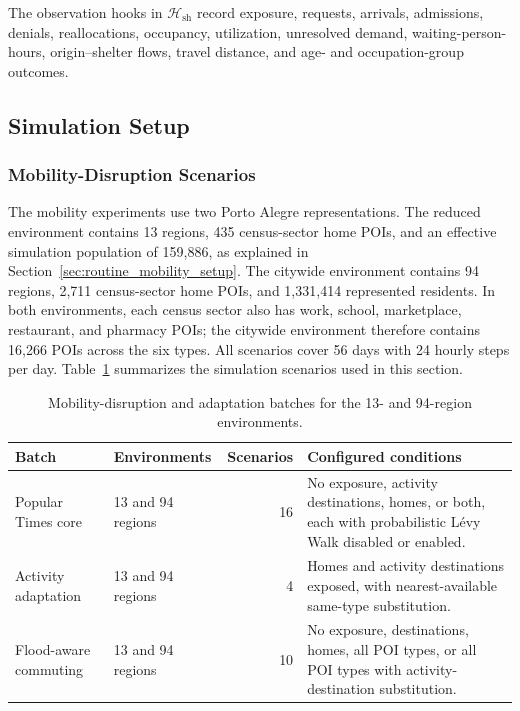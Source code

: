 The observation hooks in $\mathcal{H}_{\mathrm{sh}}$ record exposure, requests, arrivals, admissions, denials, reallocations, occupancy, utilization, unresolved demand, waiting-person-hours, origin--shelter flows, travel distance, and age- and occupation-group outcomes.

\subsection{Simulation Setup}
\label{sec:environment_disruption_setup}

\subsubsection{Mobility-Disruption Scenarios}

The mobility experiments use two Porto Alegre representations. The reduced environment contains 13 regions, 435 census-sector home POIs, and an effective simulation population of 159,886, as explained in Section~\ref{sec:routine_mobility_setup}. The citywide environment contains 94 regions, 2,711 census-sector home POIs, and 1,331,414 represented residents. In both environments, each census sector also has work, school, marketplace, restaurant, and pharmacy POIs; the citywide environment therefore contains 16,266 POIs across the six types. All scenarios cover 56 days with 24 hourly steps per day. Table~\ref{tbl:mobility_disruption_batches} summarizes the simulation scenarios used in this section.

\begin{table}[ht]
\centering
\footnotesize
\caption{Mobility-disruption and adaptation batches for the 13- and 94-region environments.}
\label{tbl:mobility_disruption_batches}
\begin{tabularx}{\linewidth}{@{}llrX@{}}
\toprule
\textbf{Batch} & \textbf{Environments} & \textbf{Scenarios} & \textbf{Configured conditions} \\
\midrule
Popular Times core
    & 13 and 94 regions & 16
    & No exposure, activity destinations, homes, or both, each with probabilistic L\'evy Walk disabled or enabled. \\
Activity adaptation
    & 13 and 94 regions & 4
    & Homes and activity destinations exposed, with nearest-available same-type substitution. \\
Flood-aware commuting
    & 13 and 94 regions & 10
    & No exposure, destinations, homes, all POI types, or all POI types with activity-destination substitution. \\
\bottomrule
\end{tabularx}
\end{table}

